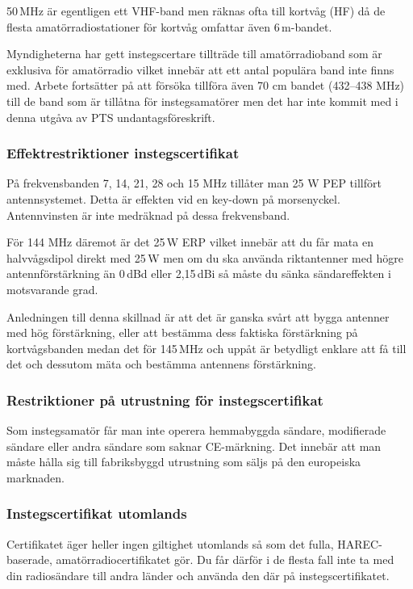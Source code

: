50\,MHz är egentligen ett VHF-band men räknas ofta till kortvåg (HF) 
då de flesta amatörradiostationer för kortvåg omfattar även 6\,m-bandet.

Myndigheterna har gett instegscertare tillträde till amatörradioband
som är exklusiva för amatörradio vilket innebär att ett antal populära
band inte finns med. Arbete fortsätter på att försöka tillföra även 70
cm bandet (432--438 MHz) till de band som är tillåtna för
instegsamatörer men det har inte kommit med i denna utgåva av PTS
undantagsföreskrift.

\subsubsection{Effektrestriktioner instegscertifikat}

På frekvensbanden 7, 14, 21, 28 och 15 MHz tillåter man 25 W PEP
tillfört antennsystemet. Detta är effekten vid en key-down på
morsenyckel. Antennvinsten är inte medräknad på dessa frekvensband.

För 144 MHz däremot är det 25\,W ERP vilket innebär att du får mata en
halvvågsdipol direkt med 25\,W men om du ska använda riktantenner med
högre antennförstärkning än 0\,dBd eller 2,15\,dBi så måste du sänka
sändareffekten i motsvarande grad.

Anledningen till denna skillnad är att det är ganska svårt att bygga
antenner med hög förstärkning, eller att bestämma dess faktiska
förstärkning på kortvågsbanden medan det för 145\,MHz och uppåt är
betydligt enklare att få till det och dessutom mäta och bestämma
antennens förstärkning.
 
\subsubsection{Restriktioner på utrustning för instegscertifikat}

Som instegsamatör får man inte operera hemmabyggda sändare, modifierade
sändare eller andra sändare som saknar CE-märkning. Det innebär att man måste
hålla sig till fabriksbyggd utrustning som säljs på den europeiska marknaden. 

\subsubsection{Instegscertifikat utomlands}

Certifikatet äger heller ingen giltighet utomlands så som det fulla,
HAREC-baserade, amatörradiocertifikatet gör. Du får därför i de flesta fall
inte ta med din radiosändare till andra länder och använda den där på 
instegscertifikatet.

